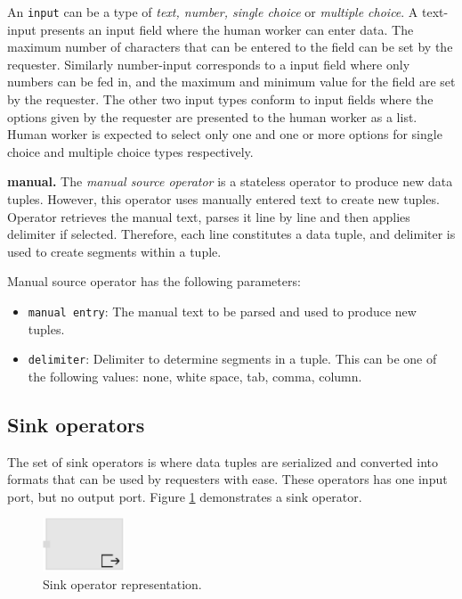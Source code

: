 An \texttt{input} can be a type of \textit{text, number, single choice} or 
\textit{multiple choice}. A text-input presents an input field where the human worker can 
enter data. The maximum number of characters that can be entered to the field can be 
set by the requester. Similarly number-input corresponds to a input field where only 
numbers can be fed in, and the maximum and minimum value for the field are set by 
the requester. The other two input types conform to input fields where the options given 
by the requester are presented to the human worker as a list. Human worker is expected 
to select only one and one or more options for single choice and multiple choice types 
respectively.


\textbf{manual.}
The \textit{manual source operator} is a stateless operator to produce new data 
tuples. However, this operator uses manually entered text to create new tuples. Operator 
retrieves the manual text, parses it line by line and then applies delimiter if selected. 
Therefore, each line constitutes a data tuple, and delimiter is used to create segments 
within a tuple.

Manual source operator has the following parameters:
\begin{itemize}
	\item \texttt{manual entry}: The manual text to be parsed and used to produce 
	new tuples.
	\item \texttt{delimiter}: Delimiter to determine segments in a tuple. This can be one 
	of the following values: none, white space, tab, comma, column.
\end{itemize}

\subsection{Sink operators}
The set of sink operators is where data tuples are serialized and converted into formats 
that can be used by requesters with ease. These operators has one input port, but no 
output port. Figure \ref{fig:sink operator} demonstrates a sink operator.

\begin{figure}[ht]
	\centering
	\includegraphics[height=60px]{figures/SinkOperator.pdf}
	\caption{Sink operator representation.}
	\label{fig:sink operator}
\end{figure}

